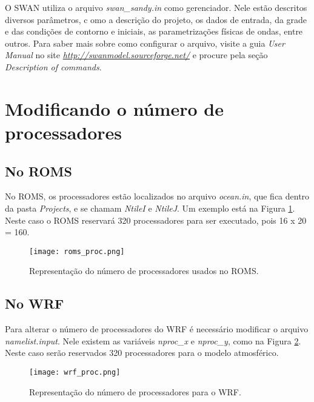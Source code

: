 \noindent O SWAN utiliza o arquivo \textit{swan\_sandy.in} como gerenciador. Nele estão descritos diversos parâmetros, c
          omo a descrição do projeto, os dados de entrada, da grade e das condições de contorno e iniciais, as parametrizações 
          físicas de ondas, entre outros. Para saber mais sobre como configurar o arquivo, visite a guia \textit{User Manual} 
          no site \textcolor{bleu_cite}{\href{http://swanmodel.sourceforge.net/}{\textit{http://swanmodel.sourceforge.net/}}}
          e procure pela seção \textit{Description of commands}.
\bigskip

\section{Modificando o número de processadores}
\bigskip

\subsection{No ROMS}
\bigskip

\noindent No ROMS, os processadores estão localizados no arquivo \textit{ocean.in}, que fica dentro da pasta \textit{Projects},
          e se chamam \textit{NtileI} e \textit{NtileJ}. Um exemplo está na Figura \textcolor{bleu_cite}{\ref{romsproc}}. 
          Neste caso o ROMS reservará 320 processadores para ser executado, pois 16 x 20 = 160.
\bigskip

\begin{figure}[H]
    \centering
    \texttt{[image: roms\_proc.png]}
    \caption{Representação do número de processadores usados no ROMS.}
    \label{romsproc}
\end{figure}
\bigskip

\subsection{No WRF}
\bigskip

\noindent Para alterar o número de processadores do WRF é necessário modificar o arquivo \textit{namelist.input}. 
          Nele existem as variáveis \textit{nproc\_x} e \textit{nproc\_y}, como na Figura \textcolor{bleu_cite}{\ref{procswrf}}. 
          Neste caso serão reservados 320 processadores para o modelo atmosférico.
\bigskip

\begin{figure}[H]
    \centering
    \texttt{[image: wrf\_proc.png]}
    \caption{Representação do número de processadores para o WRF.}
    \label{procswrf}
\end{figure}
\bigskip


